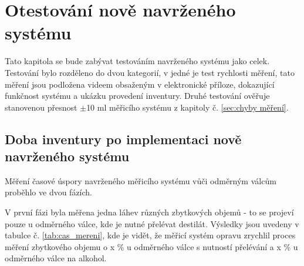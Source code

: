 


\chapter{Otestování nově navrženého systému}

Tato kapitola se bude zabývat testováním navrženého systému jako celek. Testování bylo rozděleno do dvou kategorií, v jedné je test rychlosti měření, tato měření jsou podložena videem obsaženým v elektronické příloze, dokazující funkčnost systému a ukázku provedení inventury. Druhé testování ověřuje stanovenou přesnost $\pm$10 ml měřicího systému z kapitoly č. \ref{sec:chyby měření}.



\section{Doba inventury po implementaci nově navrženého systému}

Měření časové úspory navrženého měřicího systému vůči odměrným válcům proběhlo ve dvou fázích.

V první fázi byla měřena jedna láhev různých zbytkových objemů - to se projeví pouze u odměrného válce, kde je nutné přelévat destilát. Výsledky jsou uvedeny v tabulce č. \ref{tab:cas_mereni}, kde je vidět, že měřicí systém opravu zrychlil proces měření zbytkového objemu o x \% u odměrného válce s nutností přelévání a x \% u odměrného válce na alkohol.


